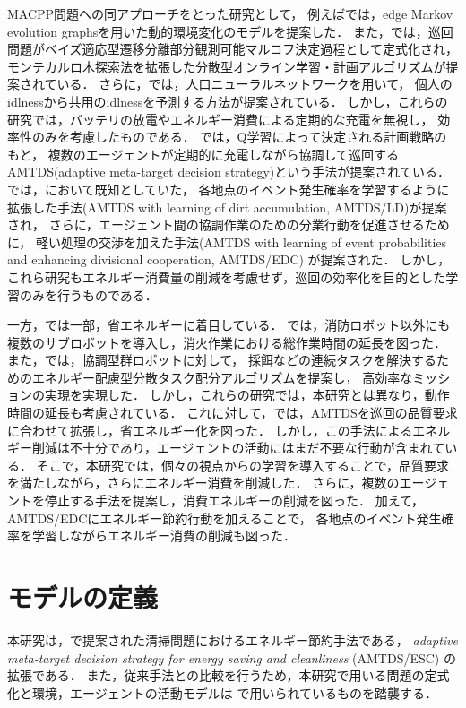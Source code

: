 \documentclass[12pt,a4j,twoside]{jarticle}
\begin{document}
MACPP問題への同アプローチをとった研究として，
例えば\cite{Othmani2017}では，edge Markov evolution graphsを用いた動的環境変化のモデルを提案した．
また，\cite{Zhou2019}では，巡回問題がベイズ適応型遷移分離部分観測可能マルコフ決定過程として定式化され，
モンテカルロ木探索法を拡張した分散型オンライン学習・計画アルゴリズムが提案されている．
さらに，\cite{Othmani2018}では，人口ニューラルネットワークを用いて，
個人のidlnessから共用のidlnessを予測する方法が提案されている．
しかし，これらの研究では，バッテリの放電やエネルギー消費による定期的な充電を無視し，
効率性のみを考慮したものである．
\cite{Yoneda2013}では，Q学習によって決定される計画戦略のもと，
複数のエージェントが定期的に充電しながら協調して巡回するAMTDS(adaptive meta-target decision strategy)という手法が提案されている．
\cite{Sugiyama2015meta}では，\cite{Yoneda2013}において既知としていた，
各地点のイベント発生確率を学習するように拡張した手法(AMTDS with learning of dirt accumulation, AMTDS/LD)が提案され，
さらに，エージェント間の協調作業のための分業行動を促進させるために，
軽い処理の交渉を加えた手法(AMTDS with learning of event probabilities and enhancing divisional cooperation, AMTDS/EDC)
が提案された．
しかし，これら研究もエネルギー消費量の削減を考慮せず，巡回の効率化を目的とした学習のみを行うものである．
\par

一方，\cite{Kim2016,Benkrid2019,Notomista2022,Wu2019,Latif2021,Huang2022}では一部，省エネルギーに着目している．
\cite{Kim2016}では，消防ロボット以外にも複数のサブロボットを導入し，消火作業における総作業時間の延長を図った．
また，\cite{Latif2021}では，協調型群ロボットに対して，
採餌などの連続タスクを解決するためのエネルギー配慮型分散タスク配分アルゴリズムを提案し，
高効率なミッションの実現を実現した．
しかし，これらの研究では，本研究とは異なり，動作時間の延長も考慮されている．
これに対して，\cite{Wu2019}では，AMTDSを巡回の品質要求に合わせて拡張し，省エネルギー化を図った．
しかし，この手法によるエネルギー削減は不十分であり，エージェントの活動にはまだ不要な行動が含まれている．
そこで，本研究では，個々の視点からの学習を導入することで，品質要求を満たしながら，さらにエネルギー消費を削減した．
さらに，複数のエージェントを停止する手法を提案し，消費エネルギーの削減を図った．
加えて，AMTDS/EDC\cite{Sugiyama2019}にエネルギー節約行動を加えることで，
各地点のイベント発生確率を学習しながらエネルギー消費の削減も図った．

\section{モデルの定義}\label{sec:MACPP_model}
本研究は，\cite{Wu2019}で提案された清掃問題におけるエネルギー節約手法である，
{\em adaptive meta-target decision strategy for energy saving and cleanliness} (AMTDS/ESC)
の拡張である．
また，従来手法との比較を行うため，本研究で用いる問題の定式化と環境，エージェントの活動モデルは
\cite{Wu2019}で用いられているものを踏襲する．
\par
\end{document}
